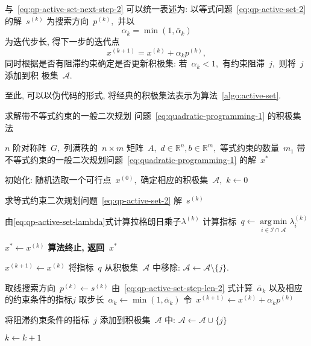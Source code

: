 \documentclass{SBCbookchapter}
\DeclareMathOperator*{\argmin}{arg\,min}
\numberwithin{equation}{section}
\begin{document}
与~\eqref{eq:qp-active-set-next-step-2} 可以统一表述为: 以等式问题~\eqref{eq:qp-active-set-2}
的解~${s}^{(k)}$ 为搜索方向~${p}^{(k)},$ 并以
\begin{equation}
\label{eq:qp-active-set-step-len-uniform}
\alpha_k = \min (1, \bar{\alpha}_k)
\end{equation}
为迭代步长, 得下一步的迭代点
\begin{equation}
\label{eq:qp-active-set-next-step-uniform}
{x}^{(k+1)} = {x}^{(k)} + \alpha_k {p}^{(k)},
\end{equation}
同时根据是否有阻滞约束确定是否更新积极集: 若~$\alpha_k < 1,$ 有约束阻滞~$j,$ 则将~$j$ 添加到积
极集~$\mathcal{A}.$

至此, 可以以伪代码的形式, 将经典的积极集法表示为算法~\ref{algo:active-set}.

\begingroup
\begin{algorithm}[!htbp]
\caption{求解带不等式约束的一般二次规划
问题~\eqref{eq:quadratic-programming-1} 的积极集法}\label{algo:active-set}
\begin{algorithmic}[1]
\renewcommand{\algorithmicrequire}{\textbf{输入:}}
\renewcommand{\algorithmicensure}{\textbf{输出:}}
\REQUIRE $n$ 阶对称阵~$G,$ 列满秩的~$n \times m$ 矩阵~$A,$ ${d} \in \mathbb{R}^n, {b} \in \mathbb{R}^m,$ 等式约束的数量~$m_1$
\ENSURE 带不等式约束的一般二次规划问题~\eqref{eq:quadratic-programming-1} 的解~$x^*$

\STATE 初始化: 随机选取一个可行点~${x}^{(0)},$ 确定相应的积极集~$\mathcal{A},$ $k \gets 0$\;


\STATE 求等式约束二次规划问题~\eqref{eq:qp-active-set-2} 解~${s}^{(k)}$\;


\STATE 由\eqref{eq:qp-active-set-lambda}式计算拉格朗日乘子${\lambda}^{(k)}$\;
\STATE 计算指标~$q \gets \argmin\limits_{i \in \mathcal{I} \cap \mathcal{A}} \lambda_i^{(k)}$\;


\STATE ${x}^* \gets {x}^{(k)}$\;
\STATE \textbf{算法终止, 返回~${x}^*$}\;

\ELSE

\STATE ${x}^{(k+1)} \gets {x}^{(k)}$\;
\STATE 将指标~$q$ 从积极集~$\mathcal{A}$ 中移除: $\mathcal{A} \gets \mathcal{A} \setminus \{ j \}$.

\ENDIF

\ELSE

\STATE 取线搜索方向~${p}^{(k)} \gets {s}^{(k)}$\;
\STATE 由~\eqref{eq:qp-active-set-step-len-2} 式计算~$\bar{\alpha}_k$ 以及相应的约束条件的指标$j$\;
\STATE 取步长~$\alpha_k \gets \min (1, \bar{\alpha}_k)$\;
\STATE 令~${x}^{(k+1)} \gets {x}^{(k)} + \alpha_k {p}^{(k)}$\;


\STATE 将阻滞约束条件的指标~$j$ 添加到积极集~$\mathcal{A}$ 中: $\mathcal{A} \gets \mathcal{A} \cup \{ j \}$\;

\ENDIF

\ENDIF

\STATE $k \gets k + 1$\;

\ENDWHILE
\end{algorithmic}
\end{algorithm}
\endgroup
\end{document}
